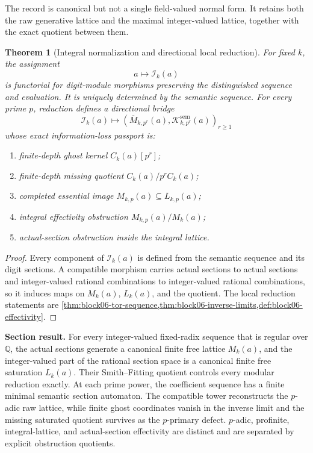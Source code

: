 \documentclass[11pt]{article}
\newtheorem{theorem}{Theorem}[section]
\theoremstyle{definition}
\theoremstyle{remark}
\begin{document}
The record is canonical but not a single field-valued normal form.  It retains both the raw generative lattice and the maximal integer-valued lattice, together with the exact quotient between them.

\begin{theorem}[Integral normalization and directional local reduction]
\label{thm:block06-integral-normalization}
For fixed \(k\), the assignment
\[
a\longmapsto\mathcal I_k(a)
\]
is functorial for digit-module morphisms preserving the distinguished sequence and evaluation.  It is uniquely determined by the semantic sequence.  For every prime \(p\), reduction defines a directional bridge
\[
\mathcal I_k(a)
\longmapsto
\left(
\overline M_{k,p^r}(a),
\mathcal K_{k,p^r}^{\mathrm{sem}}(a)
\right)_{r\geq1}
\]
whose exact information-loss passport is:
\begin{enumerate}
\item finite-depth ghost kernel \(C_k(a)[p^r]\);
\item finite-depth missing quotient \(C_k(a)/p^rC_k(a)\);
\item completed essential image \(M_{k,p}(a)\subseteq L_{k,p}(a)\);
\item integral effectivity obstruction \(M_{k,p}(a)/M_k(a)\);
\item actual-section obstruction inside the integral lattice.
\end{enumerate}
\end{theorem}

\begin{proof}
Every component of \(\mathcal I_k(a)\) is defined from the semantic sequence and its digit sections.  A compatible morphism carries actual sections to actual sections and integer-valued rational combinations to integer-valued rational combinations, so it induces maps on \(M_k(a)\), \(L_k(a)\), and the quotient.  The local reduction statements are \cref{thm:block06-tor-sequence,thm:block06-inverse-limits,def:block06-effectivity}.
\end{proof}

\begin{resultbox}
\textbf{Section result.}
For every integer-valued fixed-radix sequence that is regular over \(\mathbb Q\), the actual sections generate a canonical finite free lattice \(M_k(a)\), and the integer-valued part of the rational section space is a canonical finite free saturation \(L_k(a)\).  Their Smith--Fitting quotient controls every modular reduction exactly.  At each prime power, the coefficient sequence has a finite minimal semantic section automaton.  The compatible tower reconstructs the \(p\)-adic raw lattice, while finite ghost coordinates vanish in the inverse limit and the missing saturated quotient survives as the \(p\)-primary defect.  \(p\)-adic, profinite, integral-lattice, and actual-section effectivity are distinct and are separated by explicit obstruction quotients.
\end{resultbox}
\end{document}
